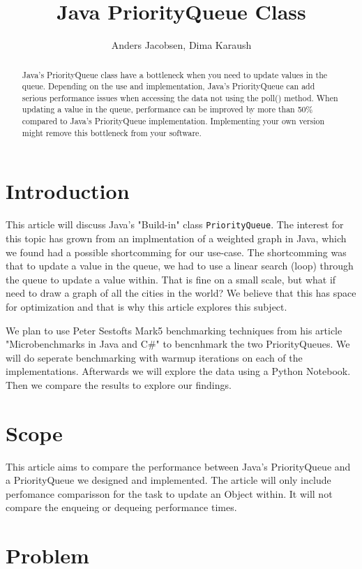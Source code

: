 \documentclass{article}
\title{Java PriorityQueue Class}
\author{Anders Jacobsen, Dima Karaush}
\begin{document}
\maketitle

\begin{abstract}
    Java's PriorityQueue class have a bottleneck when you need to update values in the queue.
    Depending on the use and implementation, Java's PriorityQueue can add serious performance 
    issues when accessing the data not using the poll() method.
    When updating a value in the queue, performance can be improved by more than 50\% compared 
    to Java's PriorityQueue implementation. Implementing your own version might remove this 
    bottleneck from your software. 
\end{abstract}

\section{Introduction}
This article will discuss Java's "Build-in" class \lstinline!PriorityQueue!. 
The interest for this topic has grown from an implmentation of a weighted graph 
in Java, which we found had a possible shortcomming for our use-case. The shortcomming was that to update
a value in the queue, we had to use a linear search (loop) through the queue to update 
a value within. That is fine on a small scale, but what if need to draw a graph of all the cities in the world? 
We believe that this has space for optimization and that is why this article explores this subject.  

We plan to use Peter Sestofts Mark5 benchmarking techniques from his article 
"Microbenchmarks in Java and C\#" \cite{microbenchmarks} to bencnhmark the two 
PriorityQueues. We will do seperate benchmarking with warmup iterations on 
each of the implementations. Afterwards we will explore the data using a Python
Notebook. Then we compare the results to explore our findings. 


\section{Scope}
This article aims to compare the performance between Java's PriorityQueue
and a PriorityQueue we designed and implemented. The article will only include 
perfomance comparisson for the task to update an Object within. It will not 
compare the enqueing or dequeing performance times.

\section{Problem}
\end{document}
